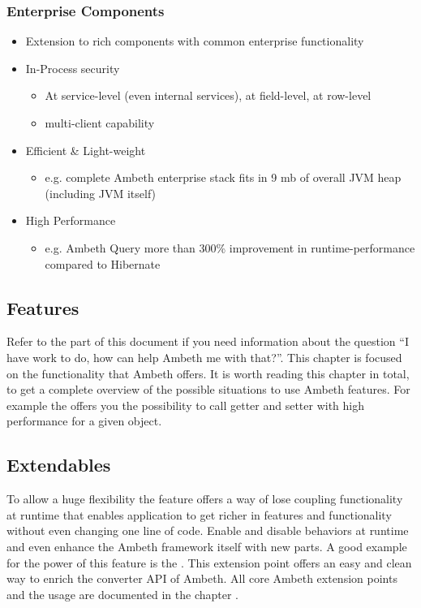 \subsubsection{Enterprise Components}
\begin{itemize}
	\item Extension to rich components with common enterprise functionality
	\item In-Process security
	\begin{itemize}
		\item At service-level (even internal services), at field-level, at row-level
		\item multi-client capability
	\end{itemize}
	\item Efficient \& Light-weight
	\begin{itemize}
		\item e.g. complete Ambeth enterprise stack fits in 9 mb of overall JVM heap (including JVM itself)
	\end{itemize}
	\item High Performance
	\begin{itemize}
		\item e.g. Ambeth Query more than 300\% improvement in runtime-performance compared to Hibernate
	\end{itemize}
\end{itemize}



\subsection{Features}
Refer to the  part of this document if you need information about the question ``I have work to do, how can help Ambeth me with that?''. This 
chapter is focused on the functionality that Ambeth offers. It is worth reading this chapter in total, to get a complete overview of the possible situations to use Ambeth features. For example the  offers you the possibility to call getter and setter with high performance for a given object.

\subsection{Extendables}
To allow a huge flexibility the feature  offers a way of lose coupling functionality at runtime that enables application to get richer in features and functionality without even changing one line of code. Enable and disable behaviors at runtime and even enhance the Ambeth framework itself with new parts. A good example for the power of this feature is the . This extension point offers an easy and clean way to enrich the converter API of Ambeth. All core Ambeth extension points and the usage are documented in the chapter .

